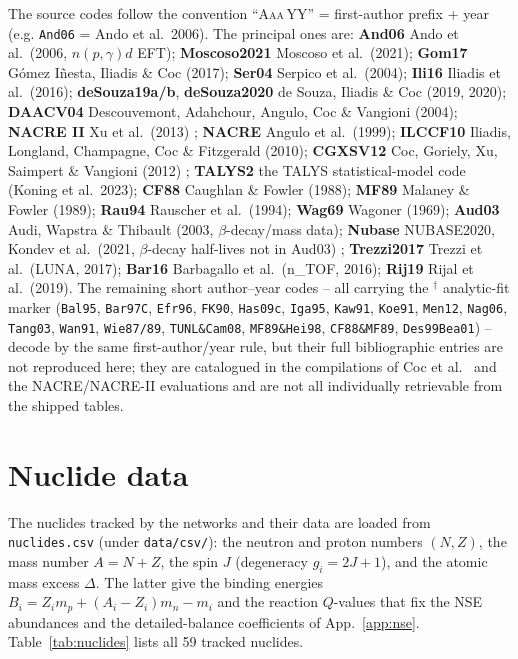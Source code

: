 \documentclass[11pt,a4paper]{article}
\newcommand{\code}[1]{\texttt{#1}}
\begin{document}
The source codes follow the convention ``\textsc{Aaa}\,YY'' = first-author
prefix + year (e.g. \texttt{And06} = Ando et al.\ 2006). The principal ones are:
\textbf{And06} Ando et al.\ (2006, $n(p,\gamma)d$ EFT);
\textbf{Moscoso2021} Moscoso et al.\ (2021);
\textbf{Gom17} G\'omez I\~nesta, Iliadis \& Coc (2017);
\textbf{Ser04} Serpico et al.\ (2004);
\textbf{Ili16} Iliadis et al.\ (2016);
\textbf{deSouza19a/b}, \textbf{deSouza2020} de Souza, Iliadis \& Coc (2019, 2020);
\textbf{DAACV04} Descouvemont, Adahchour, Angulo, Coc \& Vangioni (2004);
\textbf{NACRE II} Xu et al.\ (2013) \cite{NACRE2};
\textbf{NACRE} Angulo et al.\ (1999);
\textbf{ILCCF10} Iliadis, Longland, Champagne, Coc \& Fitzgerald (2010);
\textbf{CGXSV12} Coc, Goriely, Xu, Saimpert \& Vangioni (2012) \cite{Coc2012};
\textbf{TALYS2} the TALYS statistical-model code (Koning et al.\ 2023);
\textbf{CF88} Caughlan \& Fowler (1988);
\textbf{MF89} Malaney \& Fowler (1989);
\textbf{Rau94} Rauscher et al.\ (1994);
\textbf{Wag69} Wagoner (1969);
\textbf{Aud03} Audi, Wapstra \& Thibault (2003, $\beta$-decay/mass data);
\textbf{Nubase} NUBASE2020, Kondev et al.\ (2021, $\beta$-decay half-lives not
in Aud03) \cite{Nubase2020};
\textbf{Trezzi2017} Trezzi et al.\ (LUNA, 2017);
\textbf{Bar16} Barbagallo et al.\ (n\_TOF, 2016);
\textbf{Rij19} Rijal et al.\ (2019).
The remaining short author--year codes -- all carrying the $^\dagger$
analytic-fit marker (\texttt{Bal95}, \texttt{Bar97C}, \texttt{Efr96},
\texttt{FK90}, \texttt{Has09c}, \texttt{Iga95}, \texttt{Kaw91}, \texttt{Koe91},
\texttt{Men12}, \texttt{Nag06}, \texttt{Tang03}, \texttt{Wan91},
\texttt{Wie87/89}, \texttt{TUNL\&Cam08}, \texttt{MF89\&Hei98},
\texttt{CF88\&MF89}, \texttt{Des99Bea01}) -- decode by the same
first-author/year rule, but their full bibliographic entries are not
reproduced here; they are catalogued in the compilations of Coc et al.\
\cite{Coc2012} and the NACRE/NACRE-II evaluations \cite{NACRE2} and are not
all individually retrievable from the shipped tables.



\section{Nuclide data}\label{app:nuclides}
The nuclides tracked by the networks and their data are loaded from
\code{nuclides.csv} (under \code{data/csv/}): the neutron and proton
numbers $(N,Z)$,
the mass number $A=N+Z$, the spin $J$ (degeneracy $g_i=2J+1$), and the atomic
mass excess $\Delta$. The latter give the binding energies
$B_i=Z_i m_p+(A_i-Z_i)m_n-m_i$ and the reaction $Q$-values that fix the
NSE abundances and the detailed-balance coefficients of App.~\ref{app:nse}.
Table~\ref{tab:nuclides} lists all 59 tracked nuclides.
\end{document}
